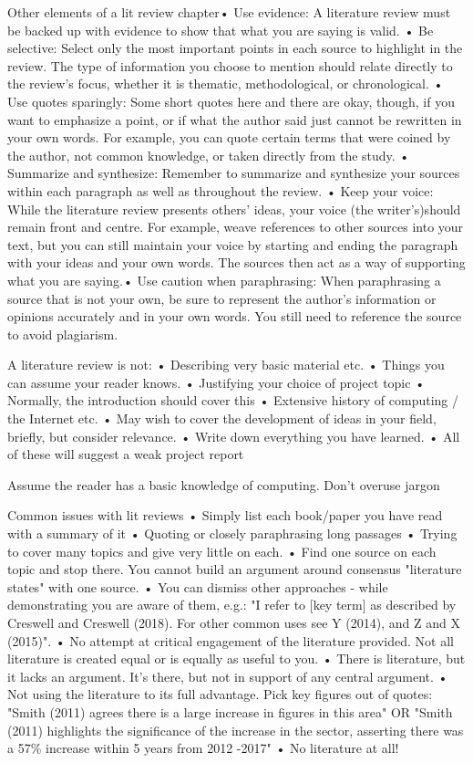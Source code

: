 {    Other elements of a lit review chapter• Use evidence: A literature review must be backed up with evidence to show that what you are saying is valid.
    • Be selective: Select only the most important points in each source to highlight in the review. The type of information you choose to mention should relate
    directly to the review's focus, whether it is thematic, methodological, or chronological.
    • Use quotes sparingly: Some short quotes here and there are okay, though, if you want to emphasize a point, or if what the author said just cannot be rewritten in your own words.
    For example, you can quote certain terms that were coined by the author, not common knowledge, or taken directly from the study.
    • Summarize and synthesize: Remember to summarize and synthesize your sources within
    each paragraph as well as throughout the review.
    • Keep your voice: While the literature review presents others' ideas, your voice (the writer's)should remain front and centre.
    For example, weave references to other sources into your text, but you can still maintain your voice by starting and ending the paragraph with your ideas and
    your own words. The sources then act as a way of supporting what you are saying.• Use caution when paraphrasing: When paraphrasing a source that is not your own, be sure to
    represent the author's information or opinions accurately and in your own words. You still need to reference the source to avoid plagiarism.

    A literature review is not:
    • Describing very basic material etc.
    • Things you can assume your reader knows.
    • Justifying your choice of project topic
    • Normally, the introduction should cover this
    • Extensive history of computing / the Internet etc.
    • May wish to cover the development of ideas in your field, briefly, but consider relevance.
    • Write down everything you have learned.
    • All of these will suggest a weak project report

    Assume the reader has a basic knowledge of computing. Don't overuse jargon

    Common issues with lit reviews
    • Simply list each book/paper you have read with a summary of it
    • Quoting or closely paraphrasing long passages
    • Trying to cover many topics and give very little on each.
    • Find one source on each topic and stop there. You cannot build an argument around consensus "literature states" with one source.
    • You can dismiss other approaches - while demonstrating you are aware of them, e.g.: "I refer to [key term] as described by Creswell and Creswell (2018). For other common uses see Y (2014), and Z and X (2015)".
    • No attempt at critical engagement of the literature provided. Not all literature is created equal or is equally as useful to you.
    • There is literature, but it lacks an argument. It's there, but not in support of any central argument.
    • Not using the literature to its full advantage. Pick key figures out of quotes:
    "Smith (2011) agrees there is a large increase in figures in this area" OR
    "Smith (2011) highlights the significance of the increase in the sector, asserting there was a 57\% increase within 5 years from 2012 -2017"
    • No literature at all!

}
